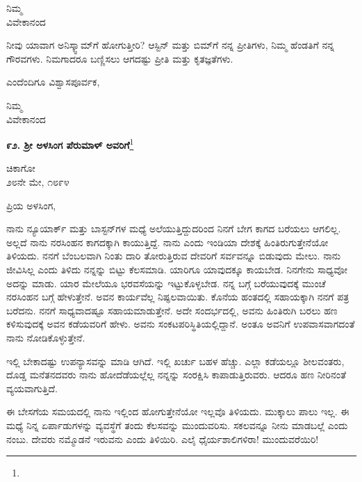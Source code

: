 \vspace{-0.3cm}

{\flushright
ನಿಮ್ಮ\\ವಿವೇಕಾನಂದ\par}

\vspace{0.2cm}

ನೀವು ಯಾವಾಗ ಅನಿಸ್ಕ್ವಾಮ್‌ಗೆ ಹೋಗುತ್ತೀರಿ? ಆಸ್ಟಿನ್ ಮತ್ತು ಬಿಮ್‌ಗೆ ನನ್ನ ಪ್ರೀತಿಗಳು, ನಿಮ್ಮ ಹೆಂಡತಿಗೆ ನನ್ನ ಗೌರವಗಳು. ನಿಮಗಾದರೂ ಬಣ್ಣಿಸಲು ಆಗದಷ್ಟು ಪ್ರೀತಿ ಮತ್ತು ಕೃತಜ್ಞತೆಗಳು.

ಎಂದೆಂದಿಗೂ ವಿಶ್ವಾಸಪೂರ್ವಕ,

{\flushright
ನಿಮ್ಮ\\ವಿವೇಕಾನಂದ\par}

\newpage

\begin{center}
\textbf{೯೨. ಶ‍್ರೀ ಅಳಸಿಂಗ ಪೆರುಮಾಳ್ ಅವರಿಗೆ}\footnote{}
\end{center}

\begin{flushright}
ಚಿಕಾಗೋ\\೨೮ನೇ ಮೇ, ೧೮೯೪
\end{flushright}

ಪ್ರಿಯ ಅಳಸಿಂಗ,

ನಾನು ನ್ಯೂಯಾರ್ಕ್ ಮತ್ತು ಬಾಸ್ಟನ್‌ಗಳ ಮಧ್ಯೆ ಅಲೆಯುತ್ತಿದ್ದುದರಿಂದ ನಿನಗೆ ಬೇಗ ಕಾಗದ ಬರೆಯಲು ಆಗಲಿಲ್ಲ. ಅಲ್ಲದೆ ನಾನು ನರಸಿಂಹನ ಕಾಗದಕ್ಕಾಗಿ ಕಾಯುತ್ತಿದ್ದೆ. ನಾನು ಎಂದು ಇಂಡಿಯಾ ದೇಶಕ್ಕೆ ಹಿಂತಿರುಗುತ್ತೇನೆಯೋ ತಿಳಿಯದು. ನನಗೆ ಬೆಂಬಲವಾಗಿ ನಿಂತು ದಾರಿ ತೋರುತ್ತಿರುವ ದೇವರಿಗೆ ಸರ್ವವನ್ನೂ ಬಿಡುವುದು ಮೇಲು. ನಾನು ಜೀವಿಸಿಲ್ಲ ಎಂದು ತಿಳಿದು ನನ್ನನ್ನು ಬಿಟ್ಟು ಕೆಲಸಮಾಡಿ. ಯಾರಿಗೂ ಯಾವುದಕ್ಕೂ ಕಾಯಬೇಡ. ನಿನಗೇನು ಸಾಧ್ಯವೋ ಅದನ್ನು ಮಾಡು. ಯಾರ ಮೇಲೆಯೂ ಭರವಸೆಯನ್ನು ಇಟ್ಟುಕೊಳ್ಳಬೇಡ. ನನ್ನ ಬಗ್ಗೆ ಬರೆಯುವುದಕ್ಕೆ ಮುಂಚೆ ನರಸಿಂಹನ ಬಗ್ಗೆ ಹೇಳುತ್ತೇನೆ. ಅವನ ಕಾರ್ಯವೆಲ್ಲ ನಿಷ್ಫಲವಾಯಿತು. ಕೊನೆಯ ಹಂತದಲ್ಲಿ ಸಹಾಯಕ್ಕಾಗಿ ನನಗೆ ಪತ್ರ ಬರೆದನು. ನನಗೆ ಸಾಧ್ಯವಾದಷ್ಟೂ ಸಹಾಯಮಾಡುತ್ತೇನೆ. ಅದೇ ಸಂದರ್ಭದಲ್ಲಿ, ಅವನು ಹಿಂತಿರುಗಿ ಬರಲು ಹಣ ಕಳಿಸುವುದಕ್ಕೆ ಅವನ ಕಡೆಯವರಿಗೆ ಹೇಳು. ಅವನು ಸಂಕಟಪರಿಸ್ಥಿತಿಯಲ್ಲಿದ್ದಾನೆ. ಅಂತೂ ಅವನಿಗೆ ಉಪವಾಸವಾಗದಂತೆ ನಾನು ನೋಡಿಕೊಳ್ಳುತ್ತೇನೆ.

ಇಲ್ಲಿ ಬೇಕಾದಷ್ಟು ಉಪನ್ಯಾಸವನ್ನು ಮಾಡಿ ಆಗಿದೆ. ಇಲ್ಲಿ ಖರ್ಚು ಬಹಳ ಹೆಚ್ಚು. ಎಲ್ಲಾ ಕಡೆಯಲ್ಲೂ ಶೀಲವಂತರು, ದೊಡ್ಡ ಮನೆತನದವರು ನಾನು ಹೋದೆಡೆಯಲ್ಲೆಲ್ಲ ನನ್ನನ್ನು ಸಂರಕ್ಷಿಸಿ ಕಾಪಾಡುತ್ತಿರುವರು. ಆದರೂ ಹಣ ನೀರಿನಂತೆ ವ್ಯಯವಾಗುತ್ತಿದೆ.

ಈ ಬೇಸಗೆಯ ಸಮಯದಲ್ಲಿ ನಾನು ಇಲ್ಲಿಂದ ಹೋಗುತ್ತೇನೆಯೋ ಇಲ್ಲವೊ ತಿಳಿಯದು. ಮುಕ್ಕಾಲು ಪಾಲು ಇಲ್ಲ. ಈ ಮಧ್ಯೆ ನಿನ್ನ ಏರ್ಪಾಡುಗಳನ್ನು ವ್ಯವಸ್ಥೆಗೆ ತಂದು ಕೆಲಸವನ್ನು ಮುಂದುವರಿಸು. ಸಕಲವನ್ನೂ ನೀನು ಮಾಡಬಲ್ಲೆ ಎಂದು ನಂಬು. ದೇವರು ನಮ್ಮೊಡನೆ ಇರುವನು ಎಂದು ತಿಳಿಯಿರಿ. ಎಲೈ ಧೈರ್ಯಶಾಲಿಗಳಿರಾ! ಮುಂದುವರೆಯಿರಿ!

